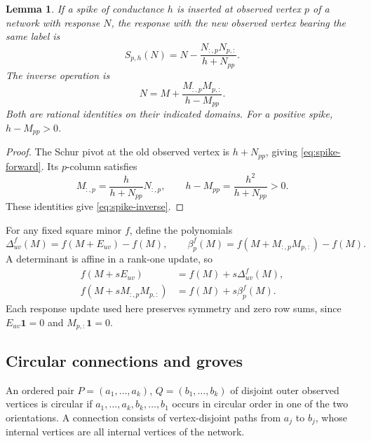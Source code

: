 \documentclass[11pt]{article}
\newtheorem{lemma}[theorem]{Lemma}
\theoremstyle{definition}
\newcommand{\one}{\mathbf 1}
\begin{document}
\begin{lemma}
\label{lem:spike}
If a spike of conductance \(h\) is inserted at observed vertex \(p\)
of a network with response \(N\), the response with the new observed
vertex bearing the same label is
\begin{equation}
 S_{p,h}(N)=N-\frac{N_{:,p}N_{p,:}}{h+N_{pp}}.
 \label{eq:spike-forward}
\end{equation}
The inverse operation is
\begin{equation}
 N=M+\frac{M_{:,p}M_{p,:}}{h-M_{pp}}.
 \label{eq:spike-inverse}
\end{equation}
Both are rational identities on their indicated domains.
For a positive spike, \(h-M_{pp}>0\).
\end{lemma}
\begin{proof}
The Schur pivot at the old observed vertex is \(h+N_{pp}\), giving
\eqref{eq:spike-forward}. Its \(p\)-column satisfies
\[
 M_{:,p}=\frac{h}{h+N_{pp}}N_{:,p},\qquad
 h-M_{pp}=\frac{h^2}{h+N_{pp}}>0.
\]
These identities give \eqref{eq:spike-inverse}.
\end{proof}

For any fixed square minor \(f\), define the polynomials
\[
 \Delta^f_{uv}(M)=f(M+E_{uv})-f(M),\qquad
 \beta^f_p(M)=f(M+M_{:,p}M_{p,:})-f(M).
\]
A determinant is affine in a rank-one update, so
\begin{align}
 f(M+sE_{uv})&=f(M)+s\Delta^f_{uv}(M),\label{eq:rank-edge}\\
 f(M+sM_{:,p}M_{p,:})&=f(M)+s\beta^f_p(M).
 \label{eq:rank-spike}
\end{align}
Each response update used here preserves symmetry and zero row sums,
since \(E_{uv}\one=0\) and \(M_{p,:}\one=0\).

\subsection{Circular connections and groves}

An ordered pair \(P=(a_1,\ldots,a_k)\), \(Q=(b_1,\ldots,b_k)\)
of disjoint outer observed vertices is circular if
\(a_1,\ldots,a_k,b_k,\ldots,b_1\) occurs in circular order in one
of the two orientations. A connection consists of vertex-disjoint
paths from \(a_j\) to \(b_j\), whose internal vertices are all internal
vertices of the network.
\end{document}
